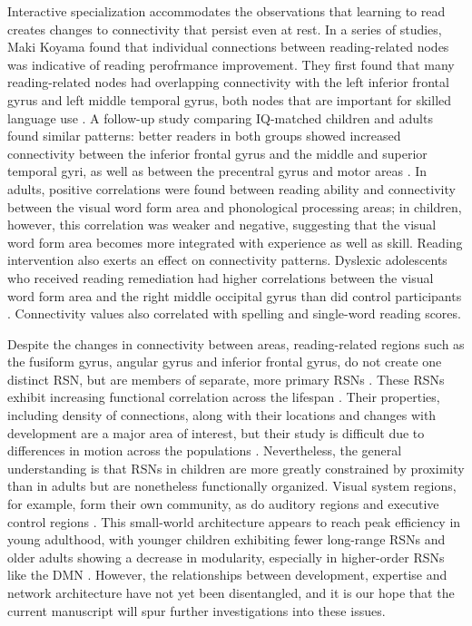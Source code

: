 Interactive specialization accommodates the observations that learning to read creates changes to connectivity that persist even at rest. In a series of studies, Maki Koyama found that individual connections between reading-related nodes was indicative of reading perofrmance improvement. They first found that many reading-related nodes had overlapping connectivity with the left inferior frontal gyrus and left middle temporal gyrus, both nodes that are important for skilled language use \citep{Koyama2010}. A follow-up study comparing IQ-matched children and adults found similar patterns: better readers in both groups showed increased connectivity between the inferior frontal gyrus and the middle and superior temporal gyri, as well as between the precentral gyrus and motor areas \citep{Koyama2011}. In adults, positive correlations were found between reading ability and connectivity between the visual word form area and phonological processing areas; in children, however, this correlation was weaker and negative, suggesting that the visual word form area becomes more integrated with experience as well as skill. Reading intervention also exerts an effect on connectivity patterns. Dyslexic adolescents who received reading remediation had higher correlations between the visual word form area and the right middle occipital gyrus than did control participants \citep{Koyama2013}. Connectivity values also correlated with spelling and single-word reading scores.

Despite the changes in connectivity between areas, reading-related regions such as the fusiform gyrus, angular gyrus and inferior frontal gyrus, do not create one distinct RSN, but are members of separate, more primary RSNs \citep{Vogel2013}. These RSNs exhibit increasing functional correlation across the lifespan \citep{Kesler2013, Uddin2010}. Their properties, including density of connections, along with their locations and changes with development are a major area of interest, but their study is difficult due to differences in motion across the populations \cite{Power2013}. Nevertheless, the general understanding is that RSNs in children are more greatly constrained by proximity than in adults but are nonetheless functionally organized. Visual system regions, for example, form their own community, as do auditory regions and executive control regions \citep{Seeley2007}. This small-world architecture appears to reach peak efficiency in young adulthood, with younger children exhibiting fewer long-range RSNs and older adults showing a decrease in modularity, especially in higher-order RSNs like the DMN \citep{Cao2016}. However, the relationships between development, expertise and network architecture have not yet been disentangled, and it is our hope that the current manuscript will spur further investigations into these issues. 

